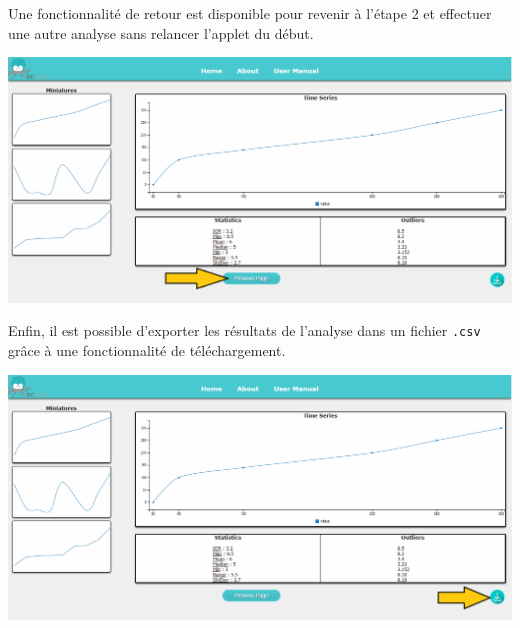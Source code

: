 		Une fonctionnalité de retour est disponible pour revenir à l'étape 2 et effectuer une autre analyse sans relancer l'applet du début.\\
			\begin{center}\includegraphics[scale=0.40]{fenetre3prec.png}\end{center}
		Enfin, il est possible d'exporter les résultats de l'analyse dans un fichier \lstinline!.csv! grâce à une fonctionnalité de téléchargement.\\
			\begin{center}\includegraphics[scale=0.40]{fenetre3Download.png}\end{center}


